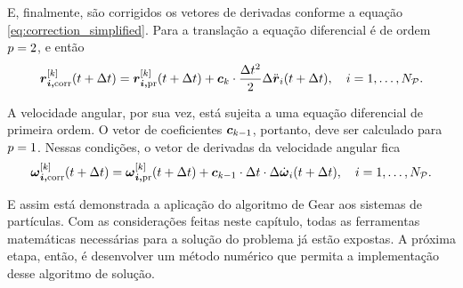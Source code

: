 E, finalmente, são corrigidos os vetores de derivadas conforme a equação \eqref{eq:correction_simplified}. Para a translação a equação diferencial é de ordem \(p = 2\), e então
\begin{equation*}
	\drvec{\taylorOrder}{\positionicorr}\pqty{t+\Dt} = \drvec{\taylorOrder}{\positionipr}\pqty{t+\Dt} + \correctorConstantVector{\taylorOrder}\cdot\dfrac{\Dt^2}{2}\Delta \accelerationi\pqty{t+\Dt}, \quad i = 1, \dots, \numberOfParticles.
\end{equation*}

A velocidade angular, por sua vez, está sujeita a uma equação diferencial de primeira ordem. O vetor de coeficientes \(\bm{c}_{k-1}\), portanto, deve ser calculado para \(p=1\). Nessas condições, o vetor de derivadas da velocidade angular fica
\begin{equation*}
		\drvec{\taylorOrder}{\angularVelocityicorr}\pqty{t+\Dt} = \drvec{\taylorOrder}{\angularVelocityipr}\pqty{t+\Dt} + \correctorConstantVector{\taylorOrder-1}\cdot\Dt\cdot\Delta \dangularVelocityi{1}\pqty{t+\Dt}, \quad i = 1, \dots, \numberOfParticles.
\end{equation*}

E assim está demonstrada a aplicação do algoritmo de Gear aos sistemas de partículas. Com as considerações feitas neste capítulo, todas as ferramentas matemáticas necessárias para a solução do problema já estão expostas. A próxima etapa, então, é desenvolver um método numérico que permita a implementação desse algoritmo de solução.



